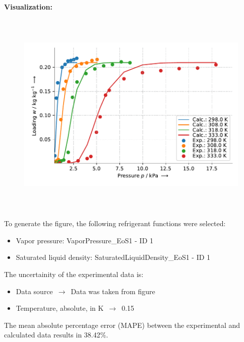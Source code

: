 \textbf{Visualization:}
%
\begin{figure}[!htp]
{\noindent\includegraphics[height=10cm, keepaspectratio]{figs/ads/ads_Water_zeotype_pellet_AQSOA-Z01_DubininAstakhov_1.pdf}}
\end{figure}
%

To generate the figure, the following refrigerant functions were selected:
\begin{itemize}
\item Vapor pressure: VaporPressure\_EoS1 - ID 1
\item Saturated liquid density: SaturatedLiquidDensity\_EoS1 - ID 1
\end{itemize}

The uncertainity of the experimental data is:
\begin{itemize}
\item Data source $\,\to\,$ Data was taken from figure
\item Temperature, absolute, in $\si{\kelvin}$ $\,\to\,$ 0.15
\end{itemize}

The mean absolute percentage error (MAPE) between the experimental and calculated data results in 38.42\%.
\FloatBarrier
\newpage
